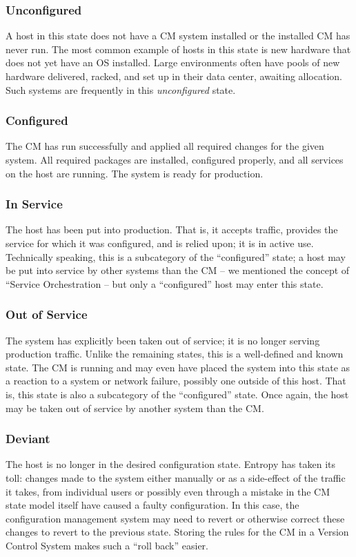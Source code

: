 \subsubsection*{Unconfigured}

A host in this state does not have a CM system
installed or the installed CM has never run.  The most
common example of hosts in this state is new hardware
that does not yet have an OS installed. Large
environments often have pools of new hardware
delivered, racked, and set up in their data center,
awaiting allocation.  Such systems are frequently in
this {\em unconfigured} state.

\subsubsection*{Configured} The CM has run
successfully and applied all required changes for the
given system.  All required packages are installed,
configured properly, and all services on the host are
running.  The system is ready for production.

\subsubsection*{In Service}  The host has been put
into production.  That is, it accepts traffic,
provides the service for which it was configured, and
is relied upon; it is in active use.  Technically
speaking, this is a subcategory of the ``configured''
state; a host may be put into service by other systems
than the CM -- we mentioned the concept of ``Service
Orchestration -- but only
a ``configured'' host may enter this state.

\subsubsection*{Out of Service} The system has
explicitly been taken out of service; it is no longer
serving production traffic.  Unlike the remaining
states, this is a well-defined and known state.  The
CM is running and may even have placed the system into
this state as a reaction to a system or network
failure, possibly one outside of this host.  That is,
this state is also a subcategory of the ``configured''
state.  Once again, the host may be taken out of
service by another system than the CM.

\subsubsection*{Deviant}  The host is no longer in the
desired configuration state.  Entropy has taken its
toll: changes made to the system either manually or as
a side-effect of the traffic it takes, from individual
users or possibly even through a mistake in the CM
state model itself have caused a faulty configuration.
In this case, the configuration management system may
need to revert or otherwise correct these changes to
revert to the previous state.  Storing the rules for
the CM in a Version Control System makes such a ``roll
back'' easier.

